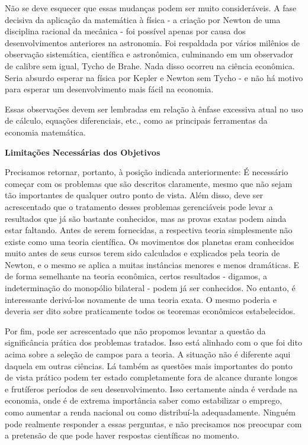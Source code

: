 \documentclass[12pt]{article}
\begin{document}
Não se deve esquecer que essas mudanças podem ser muito consideráveis. A fase decisiva da aplicação da matemática à física - a criação por Newton de uma disciplina racional da mecânica - foi possível apenas por causa dos desenvolvimentos anteriores na astronomia. Foi respaldada por vários milênios de observação sistemática, científica e astronômica, culminando em um observador de calibre sem igual, Tycho de Brahe. Nada disso ocorreu na ciência econômica. Seria absurdo esperar na física por Kepler e Newton sem Tycho - e não há motivo para esperar um desenvolvimento mais fácil na economia.

Essas observações devem ser lembradas em relação à ênfase excessiva atual no uso de cálculo, equações diferenciais, etc., como as principais ferramentas da economia matemática.

\textbf{Limitações Necessárias dos Objetivos}

Precisamos retornar, portanto, à posição indicada anteriormente: É necessário começar com os problemas que são descritos claramente, mesmo que não sejam tão importantes de qualquer outro ponto de vista. Além disso, deve ser acrescentado que o tratamento desses problemas gerenciáveis pode levar a resultados que já são bastante conhecidos, mas as provas exatas podem ainda estar faltando. Antes de serem fornecidas, a respectiva teoria simplesmente não existe como uma teoria científica. Os movimentos dos planetas eram conhecidos muito antes de seus cursos terem sido calculados e explicados pela teoria de Newton, e o mesmo se aplica a muitas instâncias menores e menos dramáticas. E de forma semelhante na teoria econômica, certos resultados - digamos, a indeterminação do monopólio bilateral - podem já ser conhecidos. No entanto, é interessante derivá-los novamente de uma teoria exata. O mesmo poderia e deveria ser dito sobre praticamente todos os teoremas econômicos estabelecidos.

Por fim, pode ser acrescentado que não propomos levantar a questão da significância prática dos problemas tratados. Isso está alinhado com o que foi dito acima sobre a seleção de campos para a teoria. A situação não é diferente aqui daquela em outras ciências. Lá também as questões mais importantes do ponto de vista prático podem ter estado completamente fora de alcance durante longos e frutíferos períodos de seu desenvolvimento. Isso certamente ainda é verdade na economia, onde é de extrema importância saber como estabilizar o emprego, como aumentar a renda nacional ou como distribuí-la adequadamente. Ninguém pode realmente responder a essas perguntas, e não precisamos nos preocupar com a pretensão de que pode haver respostas científicas no momento.
\end{document}

